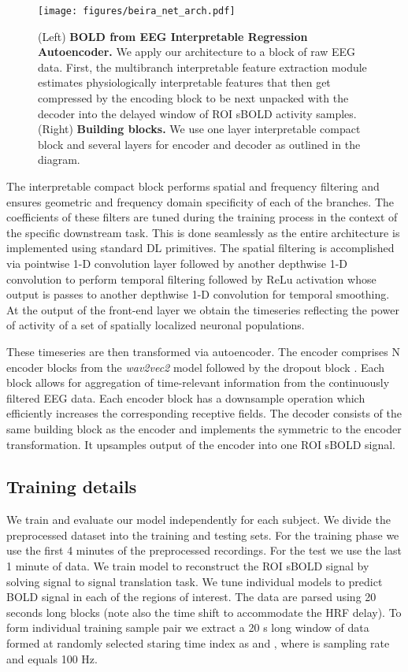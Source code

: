 \documentclass{article}
\begin{document}
\begin{figure}[ht]
    \centering
    \texttt{[image: figures/beira\_net\_arch.pdf]}
    \caption{\label{fig:model}(Left) \textbf{BOLD from EEG Interpretable Regression Autoencoder.} 
    We apply our architecture to a block of raw EEG data. First, the multibranch interpretable feature extraction module estimates physiologically interpretable features that then get compressed by the encoding block to be next unpacked with the decoder into the delayed window of ROI sBOLD activity samples.
    \newline
(Right) \textbf{Building blocks.} We use one layer interpretable compact block and several layers for encoder and decoder as outlined in the diagram.}
\end{figure}

The interpretable compact block performs spatial and frequency filtering and ensures geometric and frequency domain specificity of each of the branches. The coefficients of these filters are tuned during the training process in the context of the specific downstream task. This is done seamlessly as the entire architecture is implemented using standard DL primitives. The spatial filtering is accomplished via pointwise 1-D convolution layer followed by another depthwise 1-D convolution to perform temporal filtering followed by ReLu activation whose output is passes to another depthwise 1-D convolution for temporal smoothing. At the output of the front-end layer we obtain the timeseries reflecting the power of activity of a set of spatially localized neuronal populations. 

These timeseries are then transformed via autoencoder. The encoder comprises N encoder blocks from the \textit{wav2vec2} model \cite{wav2vec2}  followed by the dropout block \cite{dropout}. Each block allows for aggregation of time-relevant information from the continuously filtered EEG data. Each encoder block has a downsample operation which efficiently increases the corresponding receptive fields. The decoder consists of the same building block as the encoder and implements the symmetric to the encoder transformation. It upsamples output of the encoder into one ROI sBOLD signal.

\subsection{Training details}
\label{section:details}
We train and evaluate our model independently for each subject. We divide the preprocessed dataset into the training and testing sets. For the training phase we use the first 4 minutes of the preprocessed recordings. For the test we use the last 1 minute of data. We train model to reconstruct the ROI sBOLD signal by solving signal to signal translation task. We tune individual models to predict BOLD signal in each of the regions of interest. The data are parsed using 20 seconds long blocks (note also the time shift to accommodate the HRF delay). To form individual  training sample pair  we extract a 20 s long window of data formed at randomly selected staring time index  as  and , where  is sampling rate and equals 100 Hz.
\end{document}
